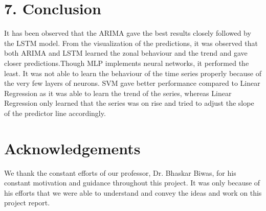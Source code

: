 \documentclass{cup-ino}
\begin{document}
\section{7. Conclusion}
It has been observed that the ARIMA gave the best results closely followed by the LSTM model. From the visualization of the predictions, it was observed that both ARIMA and LSTM learned the zonal behaviour and the trend and gave closer predictions.Though MLP implements neural networks, it performed the least. It was not able to learn the behaviour of the time series properly because of the very few layers of neurons. SVM gave better performance compared to Linear Regression as it was able to learn the trend of the series, whereas Linear Regression only learned that the series was on rise and tried to adjust the slope of the predictor line accordingly.

\appendix

\section*{Acknowledgements}
We thank the constant efforts of our professor, Dr. Bhaskar Biwas, for his constant motivation and guidance throughout this project. It was only because of his efforts that we were able to understand and convey the ideas and work on this project report.  
\end{document}

